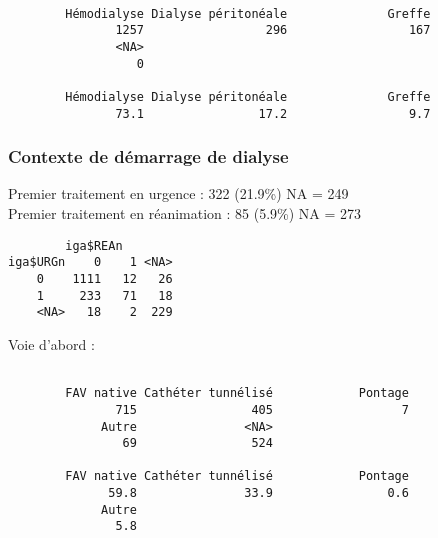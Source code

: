 \documentclass[11pt,a4paper]{article}\usepackage[]{graphicx}\usepackage[]{color}
\makeatletter
\newenvironment{kframe}{%
 \def\at@end@of@kframe{}%
 \ifinner\ifhmode%
  \def\at@end@of@kframe{\end{minipage}}%
  \begin{minipage}{\columnwidth}%
 \fi\fi%
 \def\FrameCommand##1{\hskip\@totalleftmargin \hskip-\fboxsep
 \colorbox{shadecolor}{##1}\hskip-\fboxsep
     \hskip-\linewidth \hskip-\@totalleftmargin \hskip\columnwidth}%
 \MakeFramed {\advance\hsize-\width
   \@totalleftmargin\z@ \linewidth\hsize
   \@setminipage}}%
 {\par\unskip\endMakeFramed%
 \at@end@of@kframe}
\newenvironment{knitrout}{}{} %
\makeatother
\begin{document}
\begin{knitrout}
\color{fgcolor}\begin{kframe}
\begin{verbatim}

        Hémodialyse Dialyse péritonéale              Greffe 
               1257                 296                 167 
               <NA> 
                  0 

        Hémodialyse Dialyse péritonéale              Greffe 
               73.1                17.2                 9.7 
\end{verbatim}
\end{kframe}
\end{knitrout}


    \subsubsection{Contexte de démarrage de dialyse}
    
Premier traitement en urgence :  322 (21.9\%) NA = 249
~\\

Premier traitement en réanimation :  85 (5.9\%) NA = 273

\begin{knitrout}
\color{fgcolor}\begin{kframe}
\begin{verbatim}
        iga$REAn
iga$URGn    0    1 <NA>
    0    1111   12   26
    1     233   71   18
    <NA>   18    2  229
\end{verbatim}
\end{kframe}
\end{knitrout}

Voie d’abord :
\begin{knitrout}
\color{fgcolor}\begin{kframe}
\begin{verbatim}

        FAV native Cathéter tunnélisé            Pontage 
               715                405                  7 
             Autre               <NA> 
                69                524 

        FAV native Cathéter tunnélisé            Pontage 
              59.8               33.9                0.6 
             Autre 
               5.8 
\end{verbatim}
\end{kframe}
\end{knitrout}
\end{document}
